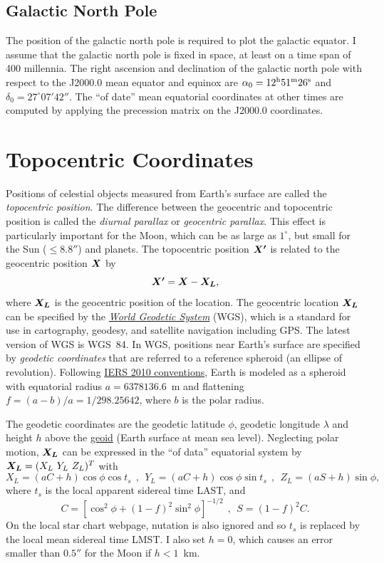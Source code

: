 \documentclass[12pt]{article}
\newcommand \beq {\begin{equation}}
\newcommand \eeq {\end{equation}}
\newcommand{\ve}[1]{\mbox{\boldmath $#1$}}
\begin{document}
\subsection{Galactic North Pole} 

The position of the galactic north pole is required to plot the galactic 
equator. I assume that the galactic north pole is fixed in space, at 
least on a time span of 400 millennia. The right ascension and declination 
of the galactic north pole with respect to the J2000.0 mean equator and equinox 
are $\alpha_0 = 12^{\rm h} 51^{\rm m} 26^{\rm s}$ and $\delta_0 = 27^\circ 07' 
42''$. The ``of date'' mean equatorial coordinates at other times are computed 
by applying the precession matrix on the J2000.0 coordinates.

\section{Topocentric Coordinates}

Positions of celestial objects measured from Earth's surface are called 
the {\em topocentric position}. The difference between the geocentric 
and topocentric position is called the {\em diurnal parallax} or 
{\em geocentric parallax}. This effect is particularly important for the Moon, 
which can be as large as $1^\circ$, but small for the Sun ($\leq 8.8''$) and planets. 
The topocentric position $\ve{X'}$ is related to the geocentric position $\ve{X}$ by 
\beq
  \ve{X'} = \ve{X} - \ve{X_L} ,
\label{eq:topoX}
\eeq
where $\ve{X_L}$ is the geocentric position of the location. The geocentric 
location $\ve{X_L}$ can be specified by the 
\href{https://en.wikipedia.org/wiki/World_Geodetic_System}{\em World Geodetic System} (WGS), 
which is a standard for use in cartography, geodesy, and satellite navigation including GPS. 
The latest version of WGS is WGS~84. 
In WGS, positions near Earth's surface are specified by {\em geodetic coordinates} 
that are referred to a reference spheroid (an ellipse of revolution). Following 
\href{https://www.iers.org/IERS/EN/Publications/TechnicalNotes/tn36.html}{IERS 2010 
conventions}, Earth is modeled as a spheroid with equatorial radius $a=6378136.6$~m 
and flattening $f=(a-b)/a=1/298.25642$, where $b$ is the polar radius.

The geodetic coordinates are the geodetic latitude $\phi$, geodetic longitude $\lambda$ and 
height $h$ above the \href{https://en.wikipedia.org/wiki/Geoid}{geoid} 
(Earth surface at mean sea level). Neglecting polar motion, $\ve{X_L}$ can be 
expressed in the ``of data'' equatorial system by $\ve{X_L}=(X_L\ Y_L\ Z_L)^T$ with 
\beq
 X_L = (aC + h)\cos \phi \cos t_s \ \ , \ \ 
 Y_L = (aC + h)\cos \phi \sin t_s \ \ , \ \ 
 Z_L = (aS + h) \sin \phi , 
\label{eq:XL}
\eeq
where $t_s$ is the local apparent sidereal time LAST, and 
\beq
  C = [\cos^2 \phi + (1-f)^2 \sin^2 \phi]^{-1/2} \ \ , \ \ 
  S = (1-f)^2 C .
\label{eq:topoCS}
\eeq
On the local star chart webpage, nutation is also ignored and so $t_s$ 
is replaced by the local mean sidereal time LMST. I also set $h=0$, which 
causes an error smaller than $0.5''$ for the Moon if $h<1$~km. 
\end{document}
